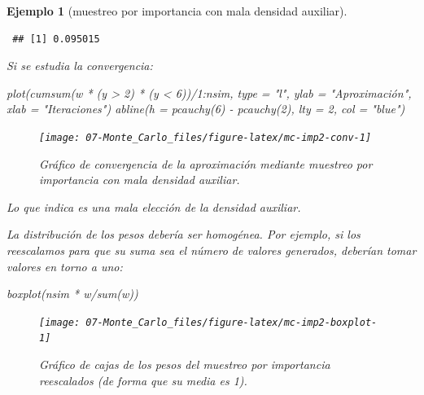 \documentclass[
  10pt,
]{book}
\newenvironment{Shaded}{\begin{snugshade}}{\end{snugshade}}
\newcommand{\AttributeTok}[1]{\textcolor[rgb]{0.77,0.63,0.00}{#1}}
\newcommand{\DecValTok}[1]{\textcolor[rgb]{0.00,0.00,0.81}{#1}}
\newcommand{\FunctionTok}[1]{\textcolor[rgb]{0.00,0.00,0.00}{#1}}
\newcommand{\NormalTok}[1]{#1}
\newcommand{\SpecialCharTok}[1]{\textcolor[rgb]{0.00,0.00,0.00}{#1}}
\newcommand{\StringTok}[1]{\textcolor[rgb]{0.31,0.60,0.02}{#1}}
\theoremstyle{break}
\newtheorem{example}{Ejemplo}[chapter]
\theoremstyle{nonumberplain}
\begin{document}
\begin{example}[muestreo por importancia con mala densidad auxiliar]
\begin{verbatim}
 ## [1] 0.095015
\end{verbatim}

Si se estudia la convergencia:

\begin{Shaded}
\begin{Highlighting}[]
\FunctionTok{plot}\NormalTok{(}\FunctionTok{cumsum}\NormalTok{(w }\SpecialCharTok{*}\NormalTok{ (y }\SpecialCharTok{\textgreater{}} \DecValTok{2}\NormalTok{) }\SpecialCharTok{*}\NormalTok{ (y }\SpecialCharTok{\textless{}} \DecValTok{6}\NormalTok{))}\SpecialCharTok{/}\DecValTok{1}\SpecialCharTok{:}\NormalTok{nsim, }\AttributeTok{type =} \StringTok{"l"}\NormalTok{, }\AttributeTok{ylab =} \StringTok{"Aproximación"}\NormalTok{, }\AttributeTok{xlab =} \StringTok{"Iteraciones"}\NormalTok{)}
\FunctionTok{abline}\NormalTok{(}\AttributeTok{h =} \FunctionTok{pcauchy}\NormalTok{(}\DecValTok{6}\NormalTok{) }\SpecialCharTok{{-}} \FunctionTok{pcauchy}\NormalTok{(}\DecValTok{2}\NormalTok{), }\AttributeTok{lty =} \DecValTok{2}\NormalTok{, }\AttributeTok{col =} \StringTok{"blue"}\NormalTok{)}
\end{Highlighting}
\end{Shaded}

\begin{figure}[!htbp]

{\centering \texttt{[image: 07-Monte\_Carlo\_files/figure-latex/mc-imp2-conv-1]} 

}

\caption{Gráfico de convergencia de la aproximación mediante muestreo por importancia con mala densidad auxiliar.}\label{fig:mc-imp2-conv}
\end{figure}

Lo que indica es una mala elección de la densidad auxiliar.

La distribución de los pesos debería ser homogénea.
Por ejemplo, si los reescalamos para que su suma sea el número de valores generados, deberían tomar valores en torno a uno:

\begin{Shaded}
\begin{Highlighting}[]
\FunctionTok{boxplot}\NormalTok{(nsim }\SpecialCharTok{*}\NormalTok{ w}\SpecialCharTok{/}\FunctionTok{sum}\NormalTok{(w))  }
\end{Highlighting}
\end{Shaded}

\begin{figure}[!htbp]

{\centering \texttt{[image: 07-Monte\_Carlo\_files/figure-latex/mc-imp2-boxplot-1]} 

}

\caption{Gráfico de cajas de los pesos del muestreo por importancia reescalados (de forma que su media es 1).}\label{fig:mc-imp2-boxplot}
\end{figure}

\end{example}
\end{document}
